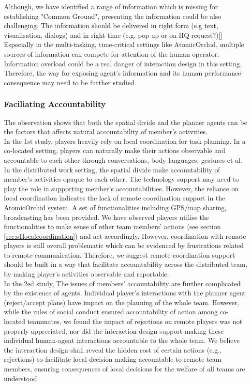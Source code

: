 Although, we have identified a range of information which is missing for establishing "Common Ground", presenting the information could be also challenging. The information should be delivered in right form (e.g text, visualisation, dialogs) and in right time (e.g. pop up or on HQ request?)[] Especially in the multi-tasking, time-critical settings like AtomicOrchid, multiple sources of information can compete for attention of the human operator. Information overload could be a real danger of interaction design in this setting. Therefore, the  way for exposing agent's information and its human performance consequence may need to be further studied.   \\

\subsubsection{Faciliating Accountability}\label{sec:conclusionAC}
The observation shows that both the spatial divide and the planner agents can be the factors that affects natural accountability of member's activities. \\

In the 1st study, players heavily rely on local coordination for task planning. In a co-located setting, players can naturally make their actions observable and accountable to each other through conversations, body languages, gestures et al. In the distributed work setting, the spatial divide make accountability of member's activities opaque to each other. The technology support may need to play the role in supporting member's accountabilities. However, the reliance on local coordination indicates the lack of remote coordination support in the AtomicOrchid system. A set of functionalities including GPS/map sharing, broadcasting has been provided. We have observed players utilise the functionalities to make sense of other team members' actions (see section \ref{sec:s1localcoordination}) and act accordingly. However, coordination with remote players is still overall problematic which can be evidenced by frustrations related to remote communication. Therefore, we suggest remote coordination support should be built in a way that facilitate accountability across the distributed team, by making player's activities observable and reportable.\\

In the 2ed study, The issues of members' accountability are further complicated by the existence of agents. Individual player's interactions with the planner agent (reject/accept plans) have impact on the planning of the whole team. However, while the rules of social conduct ensured accountability of action among co-located teammates, we found the impact of rejections on remote players was not properly appreciated; nor did the interaction design support making these individual human-agent interactions accountable to the whole team. We believe the interaction design shall reveal the hidden cost of certain actions (e.g., rejections) to facilitate local decision making accountable to remote team members, ensuring consequences of local decisions for the welfare of all teams are understood. \\

